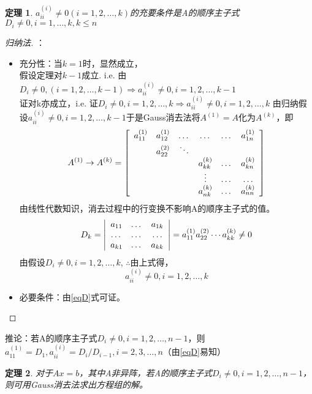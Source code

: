 \documentclass[a4paper]{article}
\newtheorem{theorem}{定理}[section]
\begin{document}
\begin{theorem}
$a^{(i)}_{ii} \neq 0 (i=1,2,\dots, k)$的充要条件是A的顺序主子式$D_i \neq 0, i=1, \dots, k, k\le n$
\end{theorem}

\begin{proof}[归纳法]：
\begin{itemize}
\item 充分性：当$k=1$时，显然成立，\\
假设定理对$k-1$成立. i.e. 由$D_i \neq 0, (i=1,2, \dots, k-1) \Rightarrow a^{(i)}_{ii} \neq 0, i=1, 2, \dots, k-1$\\
证对k亦成立，i.e. 证$D_i \neq 0, i=1,2,\dots, k \Rightarrow a^{(i)}_{ii} \neq 0, i=1,2,\dots,k$
由归纳假设$a^{(i)}_{ii} \neq 0, i=1,2,\dots, k-1$于是Gauss消去法将$A^{(1)}=A$化为$A^{(k)}$，即
$$
A^{(1)} \rightarrow A^{(k)}=\left[
\begin{array}{c c c c c c}
a^{(1)}_{11} & a^{(1)}_{12} & \dots & \dots &\dots &a^{(1)}_{1n} \\
~ & a^{(2)}_{22} & \ddots & ~ & ~ & ~ \\
~ & ~ & ~ & a^{(k)}_{kk} & \dots & a^{(k)}_{kn} \\
~ & ~ & ~ & \vdots        & \dots & \dots         \\
~ & ~ & ~ & a^{(k)}_{nk} & \dots & a^{(k)}_{nn} \\ 
\end{array}\right]
$$
由线性代数知识，消去过程中的行变换不影响A的顺序主子式的值。
\begin{equation}
\label{eqD}
D_k = \left|
\begin{array}{c c c}
a_{11} & \dots & a_{1k} \\
\dots & \dots & \dots \\
a_{k1} & \dots & a_{kk}
\end{array}\right|
=a_{11}^{(1)}a_{22}^{(2)}\cdots a_{kk}^{(k)} \neq 0
\end{equation}
由假设$D_i \neq 0, i=1,2, \dots, k$, $\therefore $由上式得，
$$a^{(i)}_{ii} \neq 0, i=1, 2, \dots, k$$
\item 必要条件：由\ref{eqD}式可证。
\end{itemize}
\end{proof}

推论：若A的顺序主子式$D_i \neq 0, i=1,2, \dots, n-1$，则$a^{(1)}_{11}=D_1, a^{(i)}_{ii}=D_i/D_{i-1}, i=2,3,\dots, n$（由\ref{eqD}易知）

\begin{theorem}
对于$Ax=b$，其中A非异阵，若A的顺序主子式$D_i \neq 0, i=1,2, \dots, n-1$，则可用Gauss消去法求出方程组的解。
\end{theorem}
\end{document}
